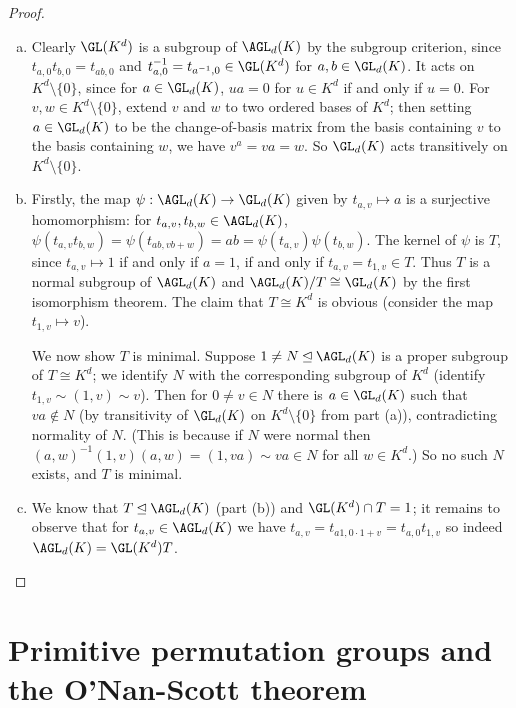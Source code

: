 \begin{proof}
    \begin{enumerate}[(a)]
        \item Clearly $\GL(K^d)$ is a subgroup of $\AGL_d(K)$ by the subgroup criterion, since $t_{a,0}t_{b,0} = t_{ab,0}$ and $t_{a,0}^{-1} = t_{a^{-1},0} \in \GL(K^d)$ for $a,b \in \GL_d(K)$. It acts on $K^d \setminus \{0\}$, since for $a \in \GL_d(K)$, $ua = 0$ for $u \in K^d$ if and only if $u = 0$. For $v,w \in K^d \setminus \{0\}$, extend $v$ and $w$ to two ordered bases of $K^d$; then setting $a \in \GL_d(K)$ to be the change-of-basis matrix from the basis containing $v$ to the basis containing $w$, we have $v^a = va = w$. So $\GL_d(K)$ acts transitively on $K^d \setminus \{0\}$.
        \item Firstly, the map $\psi : \AGL_d(K) \to \GL_d(K)$ given by $t_{a,v} \mapsto a$ is a surjective homomorphism: for $t_{a,v},t_{b,w} \in \AGL_d(K)$, $\psi(t_{a,v}t_{b,w}) = \psi(t_{ab,vb+w}) = ab = \psi(t_{a,v})\psi(t_{b,w})$. The kernel of $\psi$ is $T$, since $t_{a,v} \mapsto 1$ if and only if $a = 1$, if and only if $t_{a,v} = t_{1,v} \in T$. Thus $T$ is a normal subgroup of $\AGL_d(K)$ and $\AGL_d(K)/T \cong \GL_d(K)$ by the first isomorphism theorem. The claim that $T \cong K^d$ is obvious (consider the map $t_{1,v} \mapsto v$).

              We now show $T$ is minimal. Suppose $1 \neq N \unlhd \AGL_d(K)$ is a proper subgroup of $T \cong K^d$; we identify $N$ with the corresponding subgroup of $K^d$ (identify $t_{1,v} \sim (1,v) \sim v$). Then for $0 \neq v \in N$ there is $a \in \GL_d(K)$ such that $va \not\in N$ (by transitivity of $\GL_d(K)$ on $K^d \setminus \{0\}$ from part (a)), contradicting normality of $N$. (This is because if $N$ were normal then $(a,w)^{-1}(1,v)(a,w) = (1,va) \sim va \in N$ for all $w \in K^d$.) So no such $N$ exists, and $T$ is minimal.
        \item We know that $T \unlhd \AGL_d(K)$ (part (b)) and $\GL(K^d) \cap T = 1$; it remains to observe that for $t_{a,v} \in \AGL_d(K)$ we have $t_{a,v} = t_{a1,0 \cdot 1+v} = t_{a,0}t_{1,v}$ so indeed $\AGL_d(K) = \GL(K^d)T$.
    \end{enumerate}
\end{proof}


\section{Primitive permutation groups and the O'Nan-Scott theorem}

